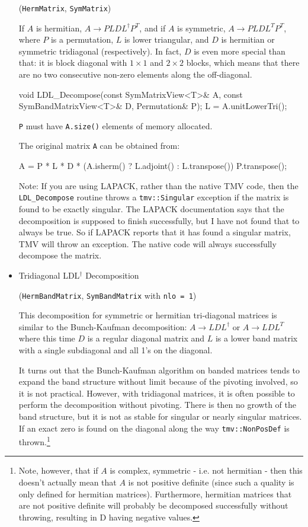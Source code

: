 \documentclass[twoside,letterpaper,11pt]{article}
\renewcommand{\tt}[1]{{\lstinline {#1}}}
\begin{document}
\begin{itemize}
(\tt{HermMatrix}, \tt{SymMatrix})

If $A$ is hermitian, $A \rightarrow P L D L^\dagger P^T$,
and if $A$ is symmetric, $A \rightarrow P L D L^T P^T$, where $P$ is a permutation,
$L$ is lower triangular, and $D$ is hermitian or symmetric tridiagonal (respectively).  
In fact, $D$ is even more special than that: it is block diagonal with $1 \times 1$
and $2 \times 2$ blocks,
which means that there are no two consecutive
non-zero elements along the off-diagonal.

\begin{tmvcode}
void LDL_Decompose(const SymMatrixView<T>& A, 
      const SymBandMatrixView<T>& D, Permutation& P);
L = A.unitLowerTri();
\end{tmvcode}
\tt{P} must have \tt{A.size()} elements of memory allocated.

The original matrix \tt{A} can be obtained from:
\begin{tmvcode}
A = P * L * D * (A.isherm() ? L.adjoint() : L.transpose())
        P.transpose();
\end{tmvcode}

Note: If you are using LAPACK, rather than the native TMV code, then the 
\tt{LDL_Decompose} routine throws a
\tt{tmv::Singular} exception if the matrix is found to be exactly singular.  The LAPACK
documentation says that the decomposition is supposed to finish successfully, but I have
not found that to always be true.  So if LAPACK reports that it has found a singular matrix, TMV
will throw an exception.  The native code will always successfully decompose the matrix.

\item Tridiagonal LDL$^\dagger$ Decomposition 

(\tt{HermBandMatrix}, \tt{SymBandMatrix} with \tt{nlo = 1})

This decomposition for symmetric or hermitian tri-diagonal matrices is 
similar to the Bunch-Kaufman decomposition: 
$A \rightarrow L D L^\dagger$
or $A \rightarrow L D L^T$ where this time $D$ is a regular diagonal matrix and $L$ is
a lower band matrix with a single subdiagonal and all 1's on the diagonal.

It turns out
that the Bunch-Kaufman algorithm on banded matrices tends to expand the band structure
without limit because of the pivoting involved, so it is not practical.
However, with tridiagonal matrices, it is often possible to perform the 
decomposition without pivoting.  There is then no growth of the band structure,
but it is not as stable for singular or nearly singular matrices.
If an exact zero is found on the diagonal along the way
\tt{tmv::NonPosDef} is thrown.\footnote{
Note, however, that if $A$ is complex, symmetric - i.e. not hermitian -
then this doesn't actually mean that $A$ is not positive definite (since such a 
quality is only defined for hermitian matrices).  Furthermore, 
hermitian matrices that are not positive definite will probably be decomposed successfully
without throwing, resulting in D having negative values.

}
\end{itemize}
\end{document}
